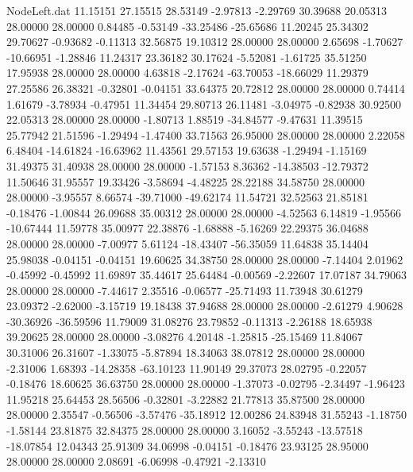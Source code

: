 \begin{filecontents}{NodeLeft.dat}
  11.15151   27.15515   28.53149    -2.97813   -2.29769   30.39688   20.05313   28.00000   28.00000    0.84485   -0.53149  -33.25486  -25.65686
  11.20245   25.34302   29.70627    -0.93682   -0.11313   32.56875   19.10312   28.00000   28.00000    2.65698   -1.70627  -10.66951   -1.28846
  11.24317   23.36182   30.17624    -5.52081   -1.61725   35.51250   17.95938   28.00000   28.00000    4.63818   -2.17624  -63.70053  -18.66029
  11.29379   27.25586   26.38321    -0.32801   -0.04151   33.64375   20.72812   28.00000   28.00000    0.74414    1.61679   -3.78934   -0.47951
  11.34454   29.80713   26.11481    -3.04975   -0.82938   30.92500   22.05313   28.00000   28.00000   -1.80713    1.88519  -34.84577   -9.47631
  11.39515   25.77942   21.51596    -1.29494   -1.47400   33.71563   26.95000   28.00000   28.00000    2.22058    6.48404  -14.61824  -16.63962
  11.43561   29.57153   19.63638    -1.29494   -1.15169   31.49375   31.40938   28.00000   28.00000   -1.57153    8.36362  -14.38503  -12.79372
  11.50646   31.95557   19.33426    -3.58694   -4.48225   28.22188   34.58750   28.00000   28.00000   -3.95557    8.66574  -39.71000  -49.62174
  11.54721   32.52563   21.85181    -0.18476   -1.00844   26.09688   35.00312   28.00000   28.00000   -4.52563    6.14819   -1.95566  -10.67444
  11.59778   35.00977   22.38876    -1.68888   -5.16269   22.29375   36.04688   28.00000   28.00000   -7.00977    5.61124  -18.43407  -56.35059
  11.64838   35.14404   25.98038    -0.04151   -0.04151   19.60625   34.38750   28.00000   28.00000   -7.14404    2.01962   -0.45992   -0.45992
  11.69897   35.44617   25.64484    -0.00569   -2.22607   17.07187   34.79063   28.00000   28.00000   -7.44617    2.35516   -0.06577  -25.71493
  11.73948   30.61279   23.09372    -2.62000   -3.15719   19.18438   37.94688   28.00000   28.00000   -2.61279    4.90628  -30.36926  -36.59596
  11.79009   31.08276   23.79852    -0.11313   -2.26188   18.65938   39.20625   28.00000   28.00000   -3.08276    4.20148   -1.25815  -25.15469
  11.84067   30.31006   26.31607    -1.33075   -5.87894   18.34063   38.07812   28.00000   28.00000   -2.31006    1.68393  -14.28358  -63.10123
  11.90149   29.37073   28.02795    -0.22057   -0.18476   18.60625   36.63750   28.00000   28.00000   -1.37073   -0.02795   -2.34497   -1.96423
  11.95218   25.64453   28.56506    -0.32801   -3.22882   21.77813   35.87500   28.00000   28.00000    2.35547   -0.56506   -3.57476  -35.18912
  12.00286   24.83948   31.55243    -1.18750   -1.58144   23.81875   32.84375   28.00000   28.00000    3.16052   -3.55243  -13.57518  -18.07854
  12.04343   25.91309   34.06998    -0.04151   -0.18476   23.93125   28.95000   28.00000   28.00000    2.08691   -6.06998   -0.47921   -2.13310

\end{filecontents}
